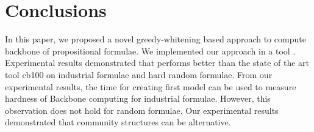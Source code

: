 \section{Conclusions}\label{sec:conc}



In this paper, we proposed a novel greedy-whitening based approach \tool to compute backbone of propositional formulae.
We implemented our approach in a tool \tool. Experimental results demonstrated that
\tool performs better than the state of the art tool cb100 on industrial formulae and hard random formulae.
From our experimental results, the time for creating first model can be used to measure hardness of Backbone computing for industrial formulae.
However, this observation does not hold for random formulae. Our experimental results demonstrated that community structures can be alternative.


